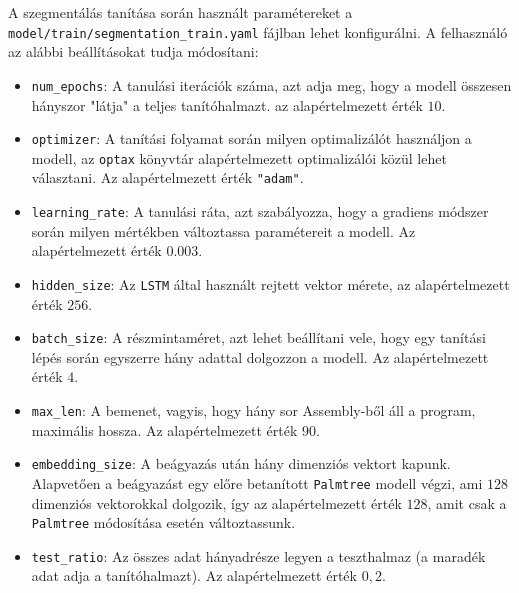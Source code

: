 A szegmentálás tanítása során használt paramétereket
a \texttt{model/train/segmentation\_train.yaml} fájlban lehet konfigurálni.
A felhasználó az alábbi beállításokat tudja módosítani:
\begin{itemize}
    \item \texttt{num\_epochs}: A tanulási iterációk száma, azt adja meg, hogy
        a modell összesen hányszor "látja" a teljes tanítóhalmazt. az
        alapértelmezett érték $10$.
    \item \texttt{optimizer}: A tanítási folyamat során milyen optimalizálót
        használjon a modell, az \texttt{optax}\cite{optax2020github} könyvtár
        alapértelmezett optimalizálói közül lehet választani. Az
        alapértelmezett érték \texttt{"adam"}\cite{adam}.
    \item \texttt{learning\_rate}: A tanulási ráta, azt szabályozza, hogy
    a gradiens módszer során milyen mértékben változtassa paramétereit
    a modell. Az alapértelmezett érték $0.003$.
    \item \texttt{hidden\_size}: Az \texttt{LSTM} által használt rejtett vektor
        mérete, az alapértelmezett érték $256$.
    \item \texttt{batch\_size}: A részmintaméret, azt lehet beállítani vele, hogy
        egy tanítási lépés során egyszerre hány adattal dolgozzon a modell. Az
        alapértelmezett érték $4$.
    \item \texttt{max\_len}: A bemenet, vagyis, hogy hány sor Assembly-ből áll
        a program, maximális hossza. Az alapértelmezett érték $90$.
    \item \texttt{embedding\_size}: A beágyazás után hány dimenziós vektort
        kapunk. Alapvetően a beágyazást egy előre betanított \texttt{Palmtree}\cite{palmtree}
        modell végzi, ami $128$ dimenziós vektorokkal dolgozik, így az
        alapértelmezett érték $128$, amit csak a \texttt{Palmtree} módosítása
        esetén változtassunk.
    \item \texttt{test\_ratio}: Az összes adat hányadrésze legyen a teszthalmaz
        (a maradék adat adja a tanítóhalmazt). Az alapértelmezett érték $0,2$.
\end{itemize}

